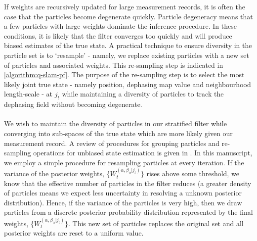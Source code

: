 If weights are recursively updated for large measurement records, it is often the case that the particles become degenerate quickly. Particle degeneracy means that a few particles with large weights dominate the inference procedure. In these conditions, it is likely that the filter converges too quickly and will produce biased estimates of the true state. A practical technique to ensure diversity in the particle set is to `resample' - namely, we replace existing particles with a new set of particles and associated weights. This re-sampling step is indicated in \cref{algorithm:q-slam-pf}. The purpose of the re-sampling step is to select the most likely joint true state - namely position, dephasing map value and neighbourhood length-scale - at $j_t$ while maintaining a diversity of particles to track the dephasing field without becoming degenerate. \\
\\
We wish to maintain the diversity of particles in our stratified filter while converging into sub-spaces of the true state which are more likely given our measurement record. A review of procedures for grouping particles and re-sampling operations for unbiased state estimation is given in \cite{li2015resampling}. In this manuscript, we employ a simple procedure for resampling particles at every iteration. If the variance of the posterior weights, $\{W_t^{(\alpha, \beta_\alpha | j_t)}\}$ rises above some threshold, we know that the effective number of particles in the filter reduces (a greater density of particles means we expect less uncertainty in resolving a unknown posterior distribution). Hence, if the variance of the particles is very high, then we draw particles from a discrete posterior probability distribution represented by the final weights, $\{W_t^{(\alpha, \beta_\alpha | j_t)}\}$. This new set of particles replaces the original set  and all posterior weights are reset to a uniform value. 
